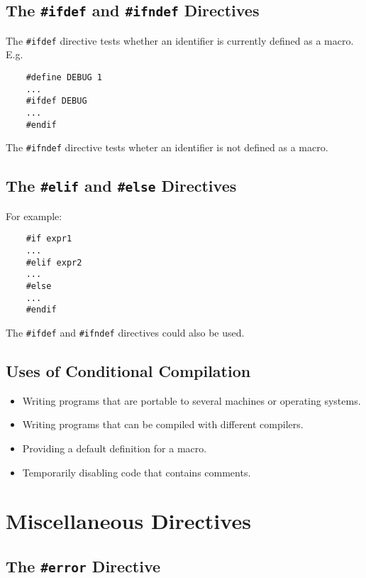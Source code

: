 \documentclass[openany]{book}
\begin{document}
    \subsection*{The \texttt{\#ifdef} and \texttt{\#ifndef} Directives} 

    The \texttt{\#ifdef} directive tests whether an identifier is currently defined as a macro. E.g.
    \begin{lstlisting}
    #define DEBUG 1
    ...
    #ifdef DEBUG
    ...
    #endif
    \end{lstlisting}

    \bigskip

    The \texttt{\#ifndef} directive tests wheter an identifier is not defined as a macro.

    \subsection*{The \texttt{\#elif} and \texttt{\#else} Directives}

    For example:

    \begin{lstlisting}
    #if expr1
    ...
    #elif expr2
    ...
    #else
    ...
    #endif
    \end{lstlisting}
    
    The \texttt{\#ifdef} and \texttt{\#ifndef} directives could also be used.

    \subsection*{Uses of Conditional Compilation}
    \begin{itemize}
        \item Writing programs that are portable to several machines or operating systems.
        \item Writing programs that can be compiled with different compilers.
        \item Providing a default definition for a macro.
        \item Temporarily disabling code that contains comments.
    \end{itemize}

    \section{Miscellaneous Directives}

    \subsection*{The \texttt{\#error} Directive}
\end{document}
